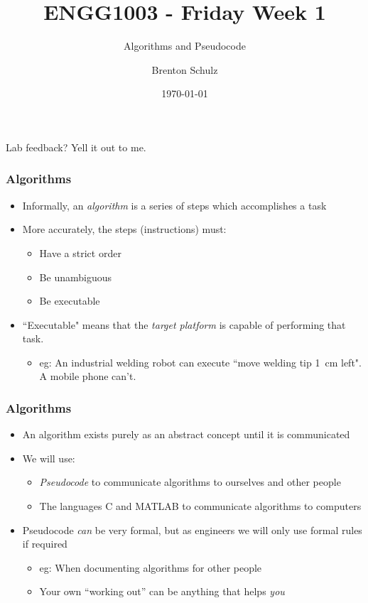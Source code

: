 \documentclass[14pt]{beamer}
\title{ENGG1003 - Friday Week 1}
\subtitle{Algorithms and Pseudocode}
\author{Brenton Schulz}
\institute{University of Newcastle}
\date{\today}
\begin{document}
\titlepage

\begin{frame}
\centering
Lab feedback? Yell it out to me.
\end{frame}

\begin{frame} %
\frametitle{Algorithms}
\begin{itemize}
\item Informally, an \textit{algorithm} is a series of steps which accomplishes a task
\item More accurately, the steps (instructions) must:
	\begin{itemize}
		\item Have a strict order
		\item Be unambiguous
		\item Be executable
	\end{itemize}
\item ``Executable" means that the \textit{target platform} is capable of performing that task.
	\begin{itemize}
		\item eg: An industrial welding robot can execute ``move welding tip 1~cm left". A mobile phone can't.
	\end{itemize}
\end{itemize}
\end{frame}

\begin{frame} %
\frametitle{Algorithms}
\begin{itemize}
\item An algorithm exists purely as an abstract concept until it is communicated
\item We will use:
	\begin{itemize}
	\item \textit{Pseudocode} to communicate algorithms to ourselves and other people
	\item The languages C and MATLAB to communicate algorithms to computers
	\end{itemize}
\item Pseudocode \textit{can} be very formal, but as engineers we will only use formal rules if required
	\begin{itemize}
		\item eg: When documenting algorithms for other people
		\item Your own ``working out'' can be anything that helps \textit{you}
	\end{itemize}
\end{itemize}
\end{frame}
\end{document}
